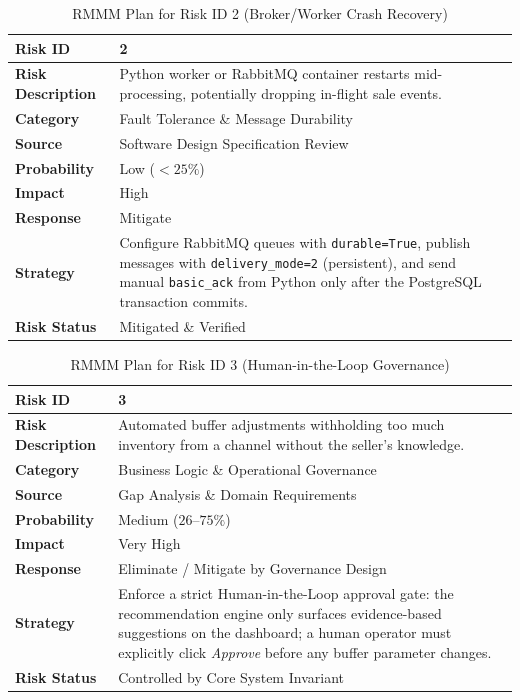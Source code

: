 \documentclass[oneside,a4paper,12pt]{report}
\begin{document}
\begin{table}[!htbp]
\begin{center}
\renewcommand{\arraystretch}{1.3}
\begin{tabularx}{\textwidth}{|l|X|}
\hline
\textbf{Risk ID} & 2 \\ \hline
\textbf{Risk Description} & Python worker or RabbitMQ container restarts mid-processing, potentially dropping in-flight sale events. \\ \hline
\textbf{Category} & Fault Tolerance \& Message Durability \\ \hline
\textbf{Source} & Software Design Specification Review \\ \hline
\textbf{Probability} & Low ($<25\%$) \\ \hline
\textbf{Impact} & High \\ \hline
\textbf{Response} & Mitigate \\ \hline
\textbf{Strategy} & Configure RabbitMQ queues with \texttt{durable=True}, publish messages with \texttt{delivery\_mode=2} (persistent), and send manual \texttt{basic\_ack} from Python only after the PostgreSQL transaction commits. \\ \hline
\textbf{Risk Status} & Mitigated \& Verified \\ \hline
\end{tabularx}
\end{center}
\caption{RMMM Plan for Risk ID 2 (Broker/Worker Crash Recovery)}
\label{tab:risk2}
\end{table}

\begin{table}[!htbp]
\begin{center}
\renewcommand{\arraystretch}{1.3}
\begin{tabularx}{\textwidth}{|l|X|}
\hline
\textbf{Risk ID} & 3 \\ \hline
\textbf{Risk Description} & Automated buffer adjustments withholding too much inventory from a channel without the seller's knowledge. \\ \hline
\textbf{Category} & Business Logic \& Operational Governance \\ \hline
\textbf{Source} & Gap Analysis \& Domain Requirements \\ \hline
\textbf{Probability} & Medium ($26\text{--}75\%$) \\ \hline
\textbf{Impact} & Very High \\ \hline
\textbf{Response} & Eliminate / Mitigate by Governance Design \\ \hline
\textbf{Strategy} & Enforce a strict Human-in-the-Loop approval gate: the recommendation engine only surfaces evidence-based suggestions on the dashboard; a human operator must explicitly click \textit{Approve} before any buffer parameter changes. \\ \hline
\textbf{Risk Status} & Controlled by Core System Invariant \\ \hline
\end{tabularx}
\end{center}
\caption{RMMM Plan for Risk ID 3 (Human-in-the-Loop Governance)}
\label{tab:risk3}
\end{table}
\end{document}
